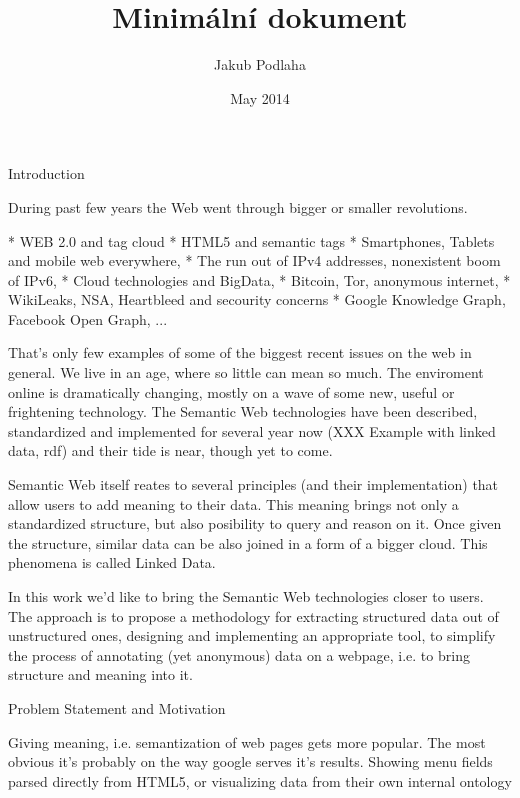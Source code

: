 
\worktype [M/CZ]
\title {Minimální dokument}
\author {Jakub Podlaha}
\date {May 2014}
\makefront



\chap Introduction

During past few years the Web went through bigger or smaller revolutions. 

\begitems
  * WEB 2.0 and tag cloud
  * HTML5 and semantic tags
  * Smartphones, Tablets and mobile web everywhere, 
  * The run out of IPv4 addresses, nonexistent boom of IPv6, 
  * Cloud technologies and BigData, 
  * Bitcoin, Tor, anonymous internet, 
  * WikiLeaks, NSA, Heartbleed and secourity concerns
  * Google Knowledge Graph, Facebook Open Graph, ...
\enditems

That's only few examples of some of the biggest recent issues on the web in
general. We live in an age, where so little can mean so much. The enviroment
online is dramatically changing, mostly on a wave of some new, useful or
frightening technology. The Semantic Web technologies have been described,
standardized and implemented for several year now  (XXX Example with linked
data, rdf) and their tide is near, though yet to come.

Semantic Web itself reates to several principles (and their implementation)
that allow users to add meaning to their data. This meaning brings not only a
standardized structure, but also posibility to query and reason on it. Once
given the structure, similar data can be also joined in a form of a bigger
cloud. This phenomena is called Linked Data. 

In this work we'd like to bring the Semantic Web technologies closer to users.
The approach is to propose a methodology for extracting structured data out of
unstructured ones, designing and implementing an appropriate tool, to simplify
the process of annotating (yet anonymous) data on a webpage, i.e. to bring
structure and meaning into it. 



\sec Problem Statement and Motivation

Giving meaning, i.e. semantization of web pages gets more popular. The most
obvious it's probably on the way google serves it's results. Showing menu
fields parsed directly from HTML5, or visualizing data from their own internal
ontology

